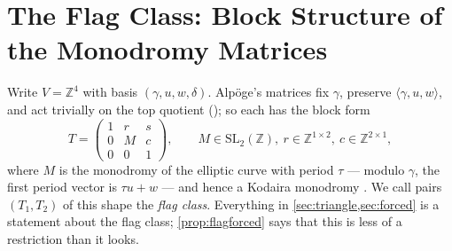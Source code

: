 \documentclass[11pt,a4paper]{article}
\newcommand{\ZZ}{\mathbb{Z}}
\newcommand{\SL}{\mathrm{SL}}
\theoremstyle{plain}
\theoremstyle{definition}
\begin{document}
\section{The Flag Class: Block Structure of the Monodromy Matrices}
\label{sec:flag}

Write $V = \ZZ^4$ with basis $(\gamma, u, w, \delta)$. Alpöge's
matrices fix $\gamma$, preserve $\langle \gamma, u, w\rangle$, and act
trivially on the top quotient (\cite[Lemma~2.7]{Alpoge}); so each has the
block form
\begin{equation}
  T = \begin{pmatrix} 1 & r & s \\ 0 & M & c \\ 0 & 0 & 1 \end{pmatrix},
  \qquad M \in \SL_2(\ZZ),\ r \in \ZZ^{1\times 2},\ c \in \ZZ^{2\times 1},
  \label{eq:flag}
\end{equation}
where $M$ is the monodromy of the elliptic curve with period $\tau$ ---
modulo $\gamma$, the first period vector is $\tau u + w$ --- and hence a
Kodaira monodromy \cite{graf2020}. We call pairs $(T_1, T_2)$ of this shape the \emph{flag
class}. Everything in \cref{sec:triangle,sec:forced} is a statement about
the flag class; \cref{prop:flagforced} says that this is less of a restriction
than it looks.
\end{document}
